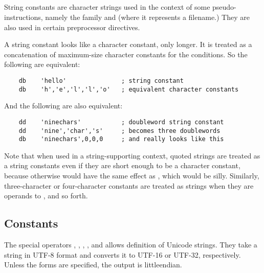 \subsection{}
\label{subsec:strconst}

String constants are character strings used in the context of some
pseudo-instructions, namely the 
 family and
 (where it represents a filename.) They are also used in
certain preprocessor directives.

A string constant looks like a character constant, only longer. It
is treated as a concatenation of maximum-size character constants
for the conditions. So the following are equivalent:

\begin{lstlisting}
	db    'hello'               ; string constant
	db    'h','e','l','l','o'   ; equivalent character constants
\end{lstlisting}

And the following are also equivalent:

\begin{lstlisting}
	dd    'ninechars'           ; doubleword string constant
	dd    'nine','char','s'     ; becomes three doublewords
	db    'ninechars',0,0,0     ; and really looks like this
\end{lstlisting}

Note that when used in a string-supporting context, quoted strings are
treated as a string constants even if they are short enough to be a
character constant, because otherwise  would have the same
effect as , which would be silly. Similarly, three-character
or four-character constants are treated as strings when they are
operands to , and so forth.

\subsection{ Constants}
\label{subsec:unicode}

The special operators , ,
, , 
and  allows definition of Unicode strings.
They take a string in UTF-8 format and converts it to UTF-16 or UTF-32,
respectively. Unless the  forms are specified, the output is
littleendian.

